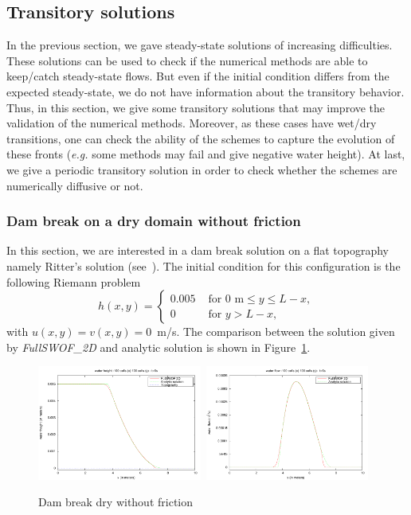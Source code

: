 \documentclass[a4paper, 11pt]{article}
\newcommand{\FullSWOF}{\emph{FullSWOF\_2D}}
\begin{document}

\subsection{Transitory solutions}

In the previous section, we gave steady-state solutions of increasing difficulties.
These solutions can be used to check if the numerical methods are able to keep/catch steady-state flows.
But even if the initial condition differs from the expected steady-state,
we do not have information about the transitory behavior.
Thus, in this section, we give some transitory solutions that may improve the validation of the numerical methods.
Moreover, as these cases have wet/dry transitions,
one can check the ability of the schemes to capture the evolution of these fronts
(\emph{e.g.} some methods may fail and give negative water height). At last, we give a periodic transitory solution in order to
check whether the schemes are numerically diffusive or not.

\subsubsection{Dam break on a dry domain without friction}
\label{RadialDamDryBench}
In this section, we are interested in a dam break solution on a flat topography namely Ritter's solution
(see~\citep[§~4.1.2]{Delestre13}).
The initial condition for this configuration is the following Riemann problem
$$h(x,y)= \begin{cases}
  0.005 & \mbox{ for }0\mbox{ m}\leq y \leq L-x ,\\
  0 & \mbox{  for } y > L-x,
\end{cases}$$ with  $u(x,y)=v(x,y)= 0$~m/s. The comparison between the solution given by \FullSWOF{} and analytic solution is shown in Figure~\ref{FigDambreak}.

\begin{figure}[htbp]
  \includegraphics[width=0.48\textwidth]{Figures_FullSWOF_2D/Dry_Dam_Break_h}\ \includegraphics[width=0.48\textwidth]{Figures_FullSWOF_2D/Dry_Dam_Break_q}
  \caption{Dam break dry without friction}
  \label{FigDambreak}
\end{figure}
\end{document}
